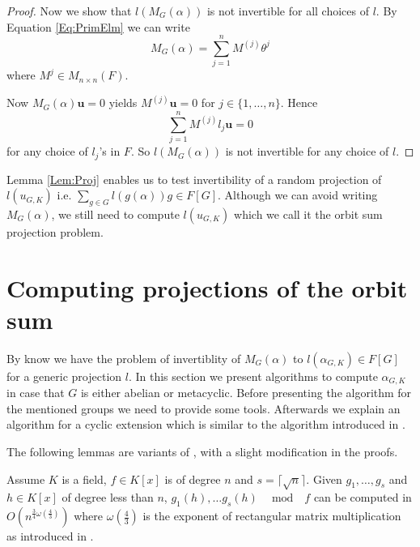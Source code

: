 \documentclass[sigconf]{acmart}
\newcommand{\osum}[2]{\alpha_{#1,#2}}
\theoremstyle{acmplain}
\begin{document}
\begin{proof}
 
 Now we show that $l(M_G(\alpha))$ is not invertible for all
 choices of $l$. By Equation \ref{Eq:PrimElm} we can write 
 $$M_G(\alpha) = \sum_{j = 1}^n M^{(j)} \theta^j$$ 
 where $M^{j} \in M_{n \times n}(F)$. 
 
 Now $M_G(\alpha) \textbf{u} =0$ yields $M^{(j)}\textbf{u} = 0$ for $j \in \lbrace 1, \ldots , n \rbrace$. Hence
 $$\sum_{j = 1}^n M^{(j)} l_j \textbf{u} = 0$$ for any choice of $l_j$'s in $F$. So $l(M_G(\alpha))$ is not invertible for any choice of $l$.
\end{proof} 
Lemma \ref{Lem:Proj} enables us to test invertibility of a random projection of $l(u_{G,K}) $ i.e. $\sum_{g \in G}
 l(g(\alpha))g \in F[G]$. Although we can avoid writing $M_G(\alpha)$, we still need to compute $l(u_{G,K})$ which
 we call it the orbit sum projection problem.


\section{Computing projections of the orbit sum}\label{sec:osum}

By know we have the problem of invertiblity of $M_G(\alpha)$ to $l(\osum{G}{K}) \in F[G]$ for a generic
projection $l$. In this section we present algorithms to compute $\alpha_{G,K}$ in case that $G$ is either abelian or metacyclic. 
Before presenting the algorithm for the mentioned groups we need to provide some tools. Afterwards we explain an algorithm
for a cyclic extension which is similar to the algorithm introduced in \cite{Kaltofen}.

The following lemmas are variants of \cite[Lemma 3 $\&$ Lemma 4]{Kaltofen}, with a slight modification in the proofs.

\begin{lemma}\cite{Kaltofen}\label{modcom}
Assume $K$ is a field, $f\in K[x]$ is of degree $n$ and $s = \lceil\sqrt{n}\rceil$. Given $g_1, \ldots , g_{s}$ and 
$h \in K[x]$ of degree less than $n$, $g_1(h), \ldots g_{s}(h)\,\,\,\mod\,\,\, f$ can be computed in
$O(n^{\frac{3}{4}\omega(\frac{4}{3})})$ where $\omega(\frac{4}{3})$ is the exponent of rectangular matrix 
multiplication as introduced in \cite{LeGall}. 
\end{lemma}
\end{document}
